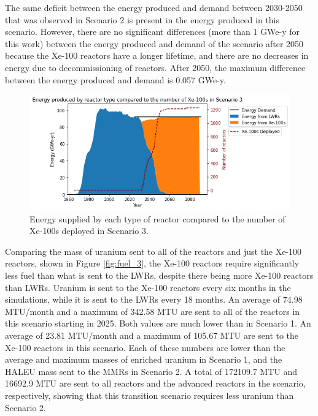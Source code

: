 The same deficit between the energy produced and demand between 
2030-2050 that was observed in Scenario 2 is present in the energy produced 
in this scenario. However, there are no significant 
differences (more than 1 GWe-y for this work) between the energy 
produced and demand of the scenario 
after 2050 because the Xe-100 reactors have a longer lifetime, and there are 
no decreases in energy due to decommissioning of reactors. After 2050, the 
maximum difference between the energy produced and demand is 0.057 GWe-y. 

\begin{figure}
    \centering 
    \includegraphics[width=\textwidth]{../figures/energy_scenario3.png}
    \caption{Energy supplied by each type of reactor compared to the number of 
    Xe-100s deployed in Scenario 3.}
    \label{fig:energy_rx_3}
\end{figure}

Comparing the mass of uranium sent to all of the reactors and just the Xe-100 
reactors, shown in Figure \ref{fig:fuel_3}, the Xe-100 reactors 
require significantly less fuel than what is sent to the \glspl{LWR}, 
despite there being more Xe-100 reactors than \glspl{LWR}. Uranium 
is sent to the Xe-100 reactors every six months in the simulations, 
while it is sent to the \glspl{LWR} every 18 months. An average of 
74.98 MTU/month and a maximum of 342.58 MTU are sent to all of the reactors 
in this scenario starting in 2025. Both values are much
lower than in Scenario 1. An average of 23.81 
MTU/month and a maximum of 105.67 MTU are sent to the Xe-100 reactors in 
this scenario. Each of these numbers are lower than the 
average and maximum masses of enriched uranium  
in Scenario 1, and the \gls{HALEU} mass sent to the \glspl{MMR} in 
Scenario 2. A total of 172109.7 MTU and 16692.9 MTU are sent to 
all reactors and the advanced reactors in the scenario, respectively, showing
that this transition scenario requires less uranium than Scenario 2. 

